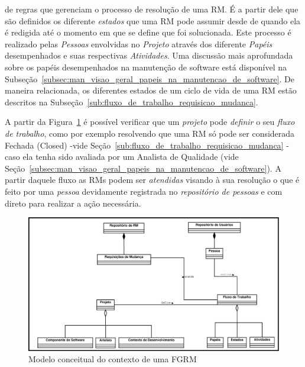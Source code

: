\begin{description}
		de regras que gerenciam o processo de resolução de uma RM\@. É a partir
		dele que são definidos os diferente \textit{estados} que uma RM pode
		assumir desde de quando ela é redigida até o momento em que se define
		que foi solucionada. Este processo é realizado pelas \textit{Pessoas}
		envolvidas no \textit{Projeto} através dos diferente \textit{Papéis}
		desempenhados e suas respectivas \textit{Atividades}. Uma discussão mais
		aprofundada sobre os papéis desempenhados na manutenção de software está
		disponível na
		Subseção~\ref{subsec:man_visao_geral_papeis_na_manutencao_de_software}.
		De maneira relacionada, os diferentes estados de um ciclo de vida de uma
		RM estão descritos na
		Subseção~\ref{sub:fluxo_de_trabalho_requisicao_mudanca}.
\end{description}

A partir da Figura~\ref{fig:diagrama-classe-conceitual-fgrm} é possível
verificar que um \textit{projeto} pode \textit{definir} o seu \textit{fluxo de
	trabalho}, como por exemplo resolvendo que uma RM só pode ser considerada
Fechada (Closed) \@-\@ vide Seção~\ref{sub:fluxo_de_trabalho_requisicao_mudanca}
\@-\@ caso ela tenha sido avaliada por um Analista de Qualidade (vide
Seção~\ref{subsec:man_visao_geral_papeis_na_manutencao_de_software}). A partir
daquele fluxo as RMs podem ser \textit{atendidas} visando à sua resolução o que
é feito por uma \textit{pessoa} devidamente registrada no \textit{repositório de
	pessoas} e com direto para realizar a ação necessária.

\begin{figure}[htpb] \centering
	\includegraphics[width=1.15\linewidth]{./chapter-manutencao-software-visao-geral/img/diagrama-classe-conceitual-fgrm.pdf}
	\caption{Modelo conceitual do contexto de uma FGRM}
\label{fig:diagrama-classe-conceitual-fgrm}
\end{figure}


